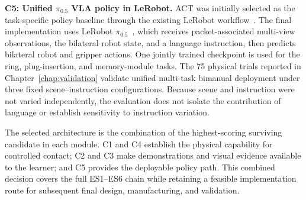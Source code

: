 \noindent\textbf{C5: Unified \texorpdfstring{$\pi_{0.5}$}{pi0.5} VLA policy in LeRobot.}
ACT was initially selected as the task-specific policy baseline through the existing LeRobot workflow~\cite{act,lerobot}. The final implementation uses LeRobot $\pi_{0.5}$~\cite{pi05,openpi,lerobotpi05}, which receives packet-associated multi-view observations, the bilateral robot state, and a language instruction, then predicts bilateral robot and gripper actions. One jointly trained checkpoint is used for the ring, plug-insertion, and memory-module tasks. The 75 physical trials reported in Chapter~\ref{chap:validation} validate unified multi-task bimanual deployment under three fixed scene--instruction configurations. Because scene and instruction were not varied independently, the evaluation does not isolate the contribution of language or establish sensitivity to instruction variation.

The selected architecture is the combination of the highest-scoring surviving candidate in each module. C1 and C4 establish the physical capability for controlled contact; C2 and C3 make demonstrations and visual evidence available to the learner; and C5 provides the deployable policy path. This combined decision covers the full ES1--ES6 chain while retaining a feasible implementation route for subsequent final design, manufacturing, and validation.
